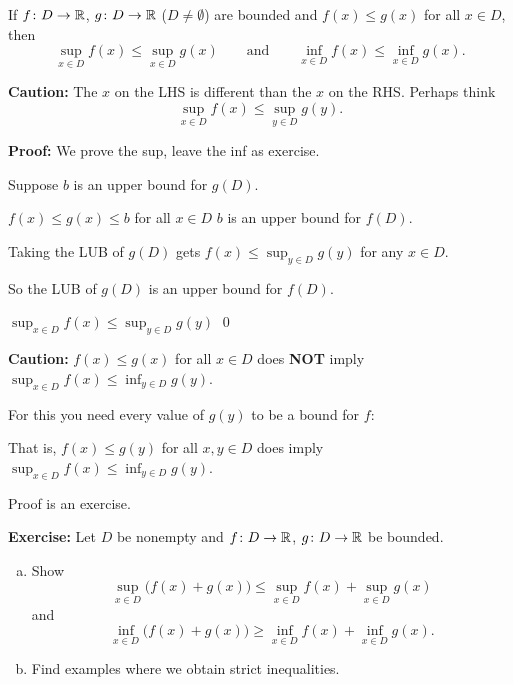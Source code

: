 \documentclass[10pt,aspectratio=149]{beamer}
\begin{document}
\begin{frame}
\begin{proposition}
If $f \colon D \to {\mathbb{R}}$, $g \colon D \to {\mathbb{R}}$ ($D\not= \emptyset$) are
bounded and
$f(x) \leq g(x)$ for all $x \in D$, then
\[
\sup_{x \in D} f(x) \leq \sup_{x \in D} g(x)
\qquad \text{and} \qquad
\inf_{x \in D} f(x) \leq \inf_{x \in D} g(x) .
\]
\end{proposition}

\pause

\textbf{Caution:}
The $x$ on the LHS is different than the $x$ on the RHS. \pause Perhaps think
\[
\sup_{x \in D} f(x) \leq \sup_{y \in D} g(y) .
\]

\pause
\textbf{Proof:} We prove the sup, leave the inf as exercise.

\pause
Suppose $b$ is an upper bound for $g(D)$.

\pause
\thus \quad
$f(x) \leq g(x) \leq b$ for all $x \in D$
\pause
\wthus
$b$ is an upper bound for $f(D)$.

\pause
Taking the LUB of $g(D)$ gets $\displaystyle
f(x) \leq \sup_{y \in D} g(y)$ for any $x \in D$.

\pause
So the LUB of $g(D)$ is an upper bound for $f(D)$.

\pause
\thus \quad
$\displaystyle \sup_{x \in D} f(x) \leq \sup_{y \in D} g(y)$
\qed

\end{frame}

\begin{frame}

\textbf{Caution:}
$f(x) \leq g(x)$ for all $x \in D$ does \textbf{NOT} imply
$\displaystyle
\sup_{x \in D} f(x) \leq \inf_{y \in D} g(y)$.

\medskip
\pause

For this you need every value of $g(y)$ to be a bound for $f$:

\pause
\medskip

That is,
$f(x) \leq g(y)$ for all $x,y \in D$ does imply
$\displaystyle
\sup_{x \in D} f(x) \leq \inf_{y \in D} g(y)$.

\pause
\medskip

Proof is an exercise.

\end{frame}

\begin{frame}

\textbf{Exercise:}
Let $D$ be nonempty and
$f \colon D \to {\mathbb{R}}$, $g \colon D \to {\mathbb{R}}$ be bounded.
\begin{enumerate}[a)]
\item
\pause
Show 
\[
\sup_{x\in D} \bigl(f(x) + g(x) \bigr) \leq
\sup_{x\in D} f(x)
+
\sup_{x\in D} g(x)
\]
\pause
and
\[
\inf_{x\in D} \bigl(f(x) + g(x) \bigr) \geq
\inf_{x\in D} f(x)
+
\inf_{x\in D} g(x) .
\]
\item
\pause
Find examples where we obtain strict inequalities.
\end{enumerate}

\end{frame}
\end{document}
